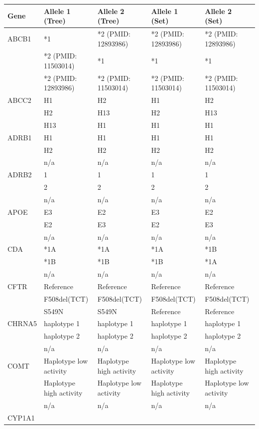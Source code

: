 \documentclass{report}
\begin{document}
\begin{tabularx}{\textwidth}{ X|XXXX }
\toprule
\textbf{Gene} & \textbf{Allele 1 (Tree) } & \textbf{Allele 2 (Tree)} & \textbf{Allele 1 (Set) } & \textbf{Allele 2 (Set)} \\
\midrule
ABCB1
& *1 & *2 (PMID: 12893986) & *2 (PMID: 12893986) & *2 (PMID: 12893986) \\
& *2 (PMID: 11503014) & *1 & *1 & *1  \\
& *2 (PMID: 12893986) & *2 (PMID: 11503014) & *2 (PMID: 11503014) & *2 (PMID: 11503014) \\
\midrule
 ABCC2
& H1 & H2 & H1 & H2 \\
& H2 & H13 & H2 & H13  \\
& H13 & H1 & H1 & H1 \\
\midrule
 ADRB1
& H1 & H1 & H1 & H1 \\
& H2 & H2 & H2 & H2  \\
& n/a & n/a & n/a & n/a \\
\midrule
 ADRB2
& 1 & 1 & 1 & 1 \\
& 2 & 2 & 2 & 2  \\
& n/a & n/a & n/a & n/a \\
\midrule
 APOE
& E3 & E2 & E3 & E2 \\
& E2 & E3 & E2 & E3  \\
& n/a & n/a & n/a & n/a \\
\midrule
 CDA
& *1A & *1A & *1A & *1B \\
& *1B & *1B & *1B & *1A  \\
& n/a & n/a & n/a & n/a \\
\midrule
 CFTR
& Reference & Reference & Reference & Reference \\
& F508del(TCT) & F508del(TCT) & F508del(TCT) & F508del(TCT)  \\
& S549N & S549N & Reference & Reference \\
\midrule
 CHRNA5
& haplotype 1 & haplotype 1 & haplotype 1 & haplotype 1 \\
& haplotype 2 & haplotype 2 & haplotype 2 & haplotype 2  \\
& n/a & n/a & n/a & n/a \\
\midrule
 COMT
& Haplotype low activity & Haplotype high activity & Haplotype low activity & Haplotype high activity \\
& Haplotype high activity & Haplotype low activity & Haplotype high activity & Haplotype low activity  \\
& n/a & n/a & n/a & n/a \\
\midrule
 CYP1A1

\end{tabularx}
\end{document}
